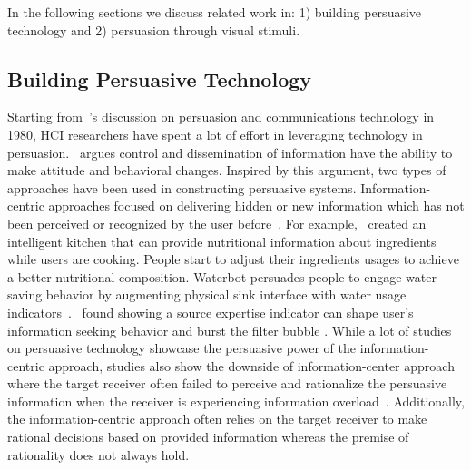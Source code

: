 
In the following sections we discuss related work in: 1) building persuasive technology and 2) persuasion through visual stimuli.

\subsection{Building Persuasive Technology}
Starting from~\textcite{goehlert1980information}'s discussion on persuasion and communications technology in 1980, HCI researchers have spent a lot of effort in leveraging technology in persuasion.~\textcite{goehlert1980information} argues control and dissemination of information have the ability to make attitude and behavioral changes. Inspired by this argument, two types of approaches have been used in constructing persuasive systems. Information-centric approaches focused on delivering hidden or new information which has not been perceived or recognized by the user before~\cite{LeeKF11}. For example,~\textcite{chi2007enabling} created an intelligent kitchen that can provide nutritional information about ingredients while users are cooking. People start to adjust their ingredients usages to achieve a better nutritional composition. Waterbot persuades people to engage water-saving behavior by augmenting physical sink interface with water usage indicators~\cite{arroyo2005waterbot}.~\textcite{liao2014expert} found showing a source expertise indicator can shape user's information seeking behavior and burst the filter bubble . While a lot of studies on persuasive technology showcase the persuasive power of the information-centric approach, studies also show the downside of information-center approach where the target receiver often failed to perceive and rationalize the persuasive information when the receiver is experiencing information overload~\cite{goehlert1980information,LeeKF11}. Additionally, the information-centric approach often relies on the target receiver to make rational decisions based on provided information whereas the premise of rationality does not always hold.

